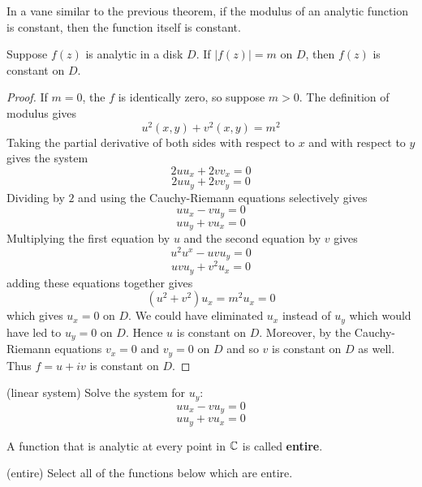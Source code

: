 \documentclass[handout]{ximera}
\begin{document}
In a vane similar to the previous theorem, if the modulus of an analytic function is constant, 
then the function itself is constant.

\begin{theorem}
Suppose $f(z)$ is analytic in a disk $D$. If $|f(z)| = m$ on  $D$, then $f(z)$ is constant on $D$.
\end{theorem}

\begin{proof}
If $m =0$, the $f$ is identically zero, so suppose $m>0$. The definition of modulus gives
\[
u^2(x,y) + v^2(x,y) = m^2
\]
Taking the partial derivative of both sides with respect to $x$ and with respect to $y$ gives the system
\[
2uu_x +2vv_x = 0
\]
\[
2uu_y + 2vv_y = 0
\]
Dividing by $2$ and using the Cauchy-Riemann equations selectively gives
\[
uu_x -vu_y = 0
\]
\[
uu_y + vu_x = 0
\]
Multiplying the first equation by $u$ and the second equation by $v$ gives
\[
u^2u^x - uvu_y=0
\]
\[
uvu_y + v^2u_x = 0
\]
adding these equations together gives
\[
\left(u^2 +v^2\right)u_x = m^2u_x = 0
\]
which gives $u_x = 0$ on $D$. We could have eliminated $u_x$ instead of $u_y$ which would 
have led to $u_y =0$ on $D$.
Hence $u$ is constant on $D$. Moreover, by the Cauchy-Riemann equations $v_x=0$ and $v_y=0$ on $D$ and 
so $v$ is constant on $D$ as well.
Thus $f = u+iv$ is constant on $D$.
\end{proof}

\begin{problem}(linear system)
Solve the system for $u_y$:
\[
uu_x -vu_y = 0
\]
\[
uu_y + vu_x = 0
\]
\begin{multipleChoice}
\end{multipleChoice}
\end{problem}


\begin{definition}
A function that is analytic at every point in $\mathbb C$ is called {\bf entire}.
\end{definition}


\begin{problem}(entire)
Select all of the functions below which are entire.
\begin{selectAll}
\end{selectAll}
\end{problem}


\end{document}
